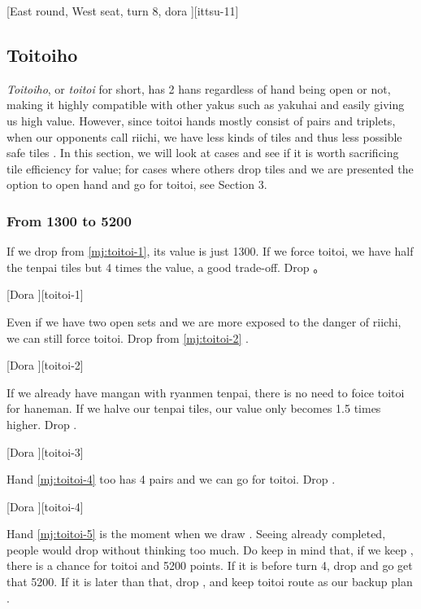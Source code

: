\documentclass[12pt]{article}
\begin{document}
[East round, West seat, turn 8, dora ][ittsu-11]


\subsection{Toitoiho}

\textit{Toitoiho}, or \textit{toitoi} for short, has 2 hans regardless of hand being open or not, making it highly compatible with other yakus such as yakuhai and easily giving us high value. However, since toitoi hands mostly consist of pairs and triplets, when our opponents call riichi, we have less kinds of tiles and thus less possible safe tiles \citep{yoteru-toitoi}. In this section, we will look at cases and see if it is worth sacrificing tile efficiency for value; for cases where others drop tiles and we are presented the option to open hand and go for toitoi, see Section 3.


\subsubsection*{From 1300 to 5200}

If we drop  from \ref{mj:toitoi-1}, its value is just 1300. If we force toitoi, we have half the tenpai tiles but 4 times the value, a good trade-off. Drop  \citep[][p.~57]{zero-teyaku}。

[Dora ][toitoi-1]

Even if we have two open sets and we are more exposed to the danger of riichi, we can still force toitoi. Drop  from \ref{mj:toitoi-2} \citep[][p.~57]{zero-teyaku}.

[Dora ][toitoi-2]

If we already have mangan with ryanmen tenpai, there is no need to foice toitoi for haneman. If we halve our tenpai tiles, our value only becomes 1.5 times higher. Drop  \citep[][p.~57]{zero-teyaku}.

[Dora ][toitoi-3]

Hand \ref{mj:toitoi-4} too has 4 pairs and we can go for toitoi. Drop  \citep[][p.~57]{zero-teyaku}.

[Dora ][toitoi-4]

Hand \ref{mj:toitoi-5} is the moment when we draw . Seeing  already completed, people would drop  without thinking too much. Do keep in mind that, if we keep , there is a chance for toitoi and 5200 points. If it is before turn 4, drop  and go get that 5200. If it is later than that, drop , and keep toitoi route as our backup plan \citep[][p.~58]{zero-teyaku}.
\end{document}
